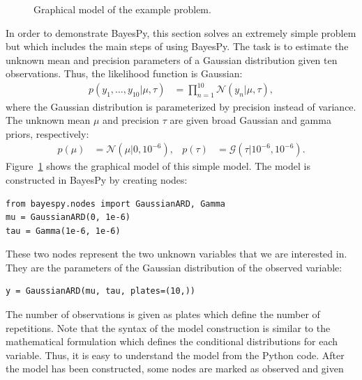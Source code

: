 \documentclass[twoside,11pt]{article}
\begin{document}
\begin{figure}
  \centering
  \caption{Graphical model of the example problem.}
  \label{fig:graphical_model}
\end{figure}
In order to demonstrate BayesPy, this section solves an extremely simple problem
but which includes the main steps of using BayesPy.  The task is to estimate the
unknown mean and precision parameters of a Gaussian distribution given ten
observations.  Thus, the likelihood function is Gaussian:
\begin{align*}
  p(y_1,\ldots,y_{10}|\mu,\tau) &= \prod^{10}_{n=1}\mathcal{N}(y_n | \mu, \tau),
\end{align*}
where the Gaussian distribution is parameterized by precision instead of
variance.  The unknown mean $\mu$ and precision $\tau$ are given broad Gaussian
and gamma priors, respectively:
\begin{align*}
  p(\mu) &= \mathcal{N}(\mu|0, 10^{-6}), & p(\tau) &= \mathcal{G}(\tau|10^{-6},
  10^{-6}).
\end{align*}
Figure~\ref{fig:graphical_model} shows the graphical model of this simple model.
The model is constructed in BayesPy by creating nodes:
\begin{lstlisting}
from bayespy.nodes import GaussianARD, Gamma
mu = GaussianARD(0, 1e-6)
tau = Gamma(1e-6, 1e-6)
\end{lstlisting}
These two nodes represent the two unknown variables that we are interested in.
They are the parameters of the Gaussian distribution of the observed variable:
\begin{lstlisting}
y = GaussianARD(mu, tau, plates=(10,))
\end{lstlisting}
The number of observations is given as plates which define the number of
repetitions.  Note that the syntax of the model construction is similar to the
mathematical formulation which defines the conditional distributions for each
variable.  Thus, it is easy to understand the model from the Python code.  After
the model has been constructed, some nodes are marked as observed and given
\end{document}
